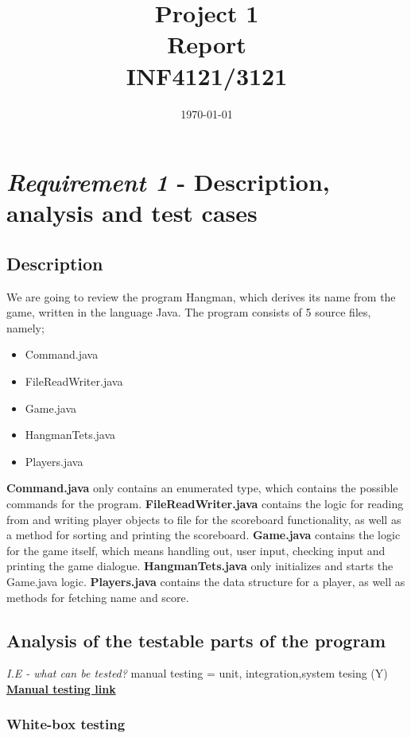 \documentclass{article}
\title{Project 1 \\ Report \\ INF4121/3121} %
\date{\today} %
\begin{document}
\maketitle %

\section{\textit{Requirement 1} - Description, analysis and test cases}

	\subsection{Description}
	We are going to review the program Hangman, which derives its name from the game, written in the language Java. The program consists of 5 source files, namely;
	\begin{itemize}
	\item Command.java
	\item FileReadWriter.java
	\item Game.java
	\item HangmanTets.java
	\item Players.java
	\end{itemize}

	\textbf{Command.java} only contains an enumerated type, which contains the possible commands for the program. \textbf{FileReadWriter.java} contains the logic for reading from and writing player objects to file for the scoreboard functionality, as well as a method for sorting and printing the scoreboard. \textbf{Game.java} contains the logic for the game itself, which means handling out, user input, checking input and printing the game dialogue. \textbf{HangmanTets.java} only initializes and starts the Game.java logic. \textbf{Players.java} contains the data structure for a player, as well as methods for fetching name and score.

	\subsection{Analysis of the testable parts of the program\newline}
	\textit{I.E - what can be tested?\newline}
	manual testing = unit, integration,system tesing (Y)
	\href{https://en.wikipedia.org/wiki/Manual_testing}{\textbf{Manual testing link}}


		\subsubsection{White-box testing}
\end{document}
